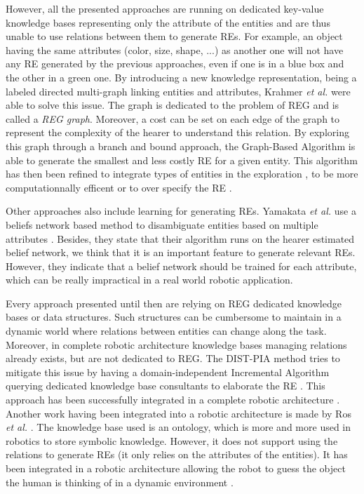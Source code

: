 \documentclass[a4paper,11pt,twoside]{StyleThese}
\begin{document}
However, all the presented approaches are running on dedicated key-value knowledge bases representing only the attribute of the entities and are thus unable to use relations between them to generate REs. For example, an object having the same attributes (color, size, shape, ...) as another one will not have any RE generated by the previous approaches, even if one is in a blue box and the other in a green one. By introducing a new knowledge representation, being a labeled directed multi-graph linking entities and attributes, Krahmer \textit{et al.} were able to solve this issue. The graph is dedicated to the problem of REG and is called a \textit{REG graph}. Moreover, a cost can be set on each edge of the graph to represent the complexity of the hearer to understand this relation. By exploring this graph through a branch and bound approach, the Graph-Based Algorithm \cite{GBA} is able to generate the smallest and less costly RE for a given entity. This algorithm has then been refined to integrate types of entities in the exploration \cite{GBA category descriptor}, to be more computationnally efficent \cite{Li thesis} or to over specify the RE \cite{longest first}.

Other approaches also include learning for generating REs. Yamakata \textit{et al.} use a beliefs network based method to disambiguate entities based on multiple attributes \cite{plop}. Besides, they state that their algorithm runs on the hearer estimated belief network, we think that it is an important feature to generate relevant REs. However, they indicate that a belief network should be trained for each attribute, which can be really impractical in a real world robotic application.

Every approach presented until then are relying on REG dedicated knowledge bases or data structures. Such structures can be cumbersome to maintain in a dynamic world where relations between entities can change along the task. Moreover, in complete robotic architecture knowledge bases managing relations already exists, but are not dedicated to REG. The DIST-PIA method tries to mitigate this issue by having a domain-independent Incremental Algorithm querying dedicated knowledge base consultants to elaborate the RE \cite{DIST-PIA}. This approach has been successfully integrated in a complete robotic architecture \cite{architecture}. Another work having been integrated into a robotic architecture is made by Ros \textit{et al.} \cite{ros}. The knowledge base used is an ontology, which is more and more used in robotics to store symbolic knowledge. However, it does not support using the relations to generate REs (it only relies on the attributes of the entities). It has been integrated in a robotic architecture allowing the robot to guess the object the human is thinking of in a dynamic environment \cite{lemaignan}.
\end{document}
